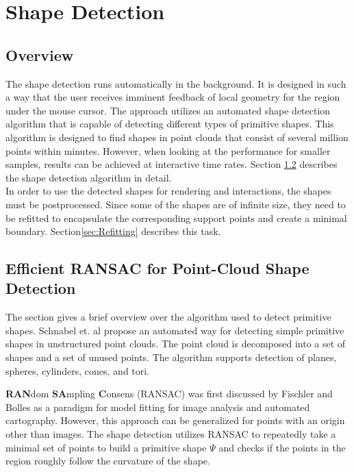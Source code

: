 \chapter{Shape Detection}
\label{chap:shapeDetection}

\newpage


\section{Overview}

The shape detection runs automatically in the background. It is designed in such a way that the user receives imminent feedback of local geometry for the region under the mouse cursor. The approach utilizes an automated shape detection algorithm that is capable of detecting different types of primitive shapes. This algorithm is designed to find shapes in point clouds that consist of several million points within minutes. However, when looking at the performance for smaller samples, results can be achieved at interactive time rates. Section \ref{sec:schnabel} describes the shape detection algorithm in detail. 
\\

In order to use the detected shapes for rendering and interactions, the shapes must be postprocessed. Since some of the shapes are of infinite size, they need to be refitted to  encapsulate the corresponding support points and create a minimal boundary. Section\ref{sec:Refitting} describes this task. 


\section{Efficient RANSAC for Point-Cloud Shape Detection}
\label{sec:schnabel}

The section gives a brief overview over the algorithm used to detect primitive shapes. 
Schnabel et. al\cite{schnabel-2007-efficient} propose an automated way for detecting simple primitive shapes in unstructured point clouds. The point cloud is decomposed into a set of shapes and a set of unused points. The algorithm supports detection of planes, spheres, cylinders, cones, and tori. 

\textbf{RAN}dom \textbf{SA}mpling \textbf{C}onsens (RANSAC) was first discussed by Fischler and Bolles\cite{fischler1981random} as a paradigm for model fitting for image analysis and automated cartography. However, this approach can be generalized for points with an origin other than images. The shape detection utilizes RANSAC to repeatedly take a minimal set of points to build a primitive shape $\Psi$ and checks if the points in the region roughly follow the curvature of the shape. 

